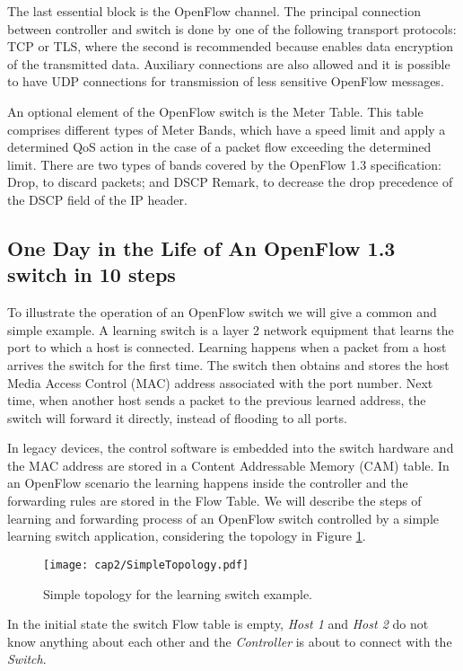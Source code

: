 The last essential block is the OpenFlow channel. The principal connection between controller and switch is done by one of the following transport protocols: TCP or TLS, where the second is recommended because enables data encryption of the transmitted data. Auxiliary connections are also allowed and it is possible to have UDP connections for transmission of less sensitive OpenFlow messages.

An optional element of the OpenFlow switch is the Meter Table. This table comprises different types of Meter Bands, which have a speed limit and apply a determined QoS action in the case of a packet flow exceeding the determined limit. There are two types of bands covered by the OpenFlow 1.3 specification: Drop, to discard packets; and DSCP Remark, to decrease the drop precedence of the DSCP field of the IP header.

\subsection{One Day in the Life of An OpenFlow 1.3 switch in 10 steps}

To illustrate the operation of an OpenFlow switch we will give a common and simple example. A learning switch is a layer 2 network equipment that learns the port to which a host is connected. Learning happens when a packet from a host arrives the switch for the first time. The switch then obtains and stores the host Media Access Control (MAC) address associated with the port number. Next time, when another host sends a packet to the previous learned address, the switch will forward it directly, instead of flooding to all ports. 

In legacy devices, the control software is embedded into the switch hardware and the MAC address are stored in a Content Addressable Memory (CAM) table. In an OpenFlow scenario the learning happens inside the controller and the forwarding rules are stored in the Flow Table. We will describe the steps of learning and forwarding process of an OpenFlow switch controlled by a simple learning switch application, considering the topology in Figure \ref{fig:simpletopo}. 

\begin{figure}[h!]
\centering
\texttt{[image: cap2/SimpleTopology.pdf]}
\caption{Simple topology for the learning switch example.}
\label{fig:simpletopo}
\end{figure}

In the initial state the switch Flow table is empty, \textit{Host 1} and \textit{Host 2} do not know anything about each other and the  \textit{Controller} is about to connect with the \textit{Switch}. 

